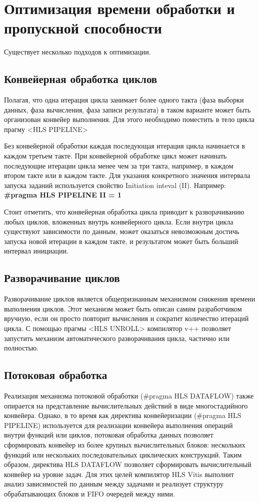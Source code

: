 \section{Оптимизация времени обработки и пропускной способности}

Существует несколько подходов к оптимизации.

\subsection{Конвейерная обработка циклов}

Полагая, что одна итерация цикла занимает более одного такта (фаза выборки данных, фаза вычисления, фаза записи результата) в таком варианте может быть организован конвейер выполнения. Для этого необходимо поместить в тело цикла прагму <HLS PIPELINE>

Без конвейерной обработки каждая последующая итерация цикла начинается в каждом третьем такте. При конвейерной обработке цикл может начинать последующие итерации цикла менее чем за три такта, например, в каждом втором такте или в каждом такте. Для указания конкретного значения интервала запуска заданий используется свойство Initiation inteval (II). Например: \textbf{\#pragma HLS PIPELINE II = 1}

Стоит отметить, что конвейерная обработка цикла приводит к разворачиванию любых циклов, вложенных внутрь конвейерного цикла. Если внутри цикла существуют зависимости по данным, может оказаться невозможным достичь запуска новой итерации в каждом такте, и результатом может быть больший интервал инициации.


\subsection{Разворачивание циклов}

Разворачивание циклов является общепризнанным механизмом снижения времени выполнения циклов. Этот механизм может быть описан самим разработчиком вручную, если он просто повторит вычисления и сократит количество итераций цикла. С помощью прагмы <HLS UNROLL> компилятор v++ позволяет запустить механизм автоматического разворачивания цикла, частично или полностью.


\subsection{Потоковая обработка}

Реализация механизма потоковой обработки (\#pragma HLS DATAFLOW) также опирается на представление вычислительных действий в виде многостадийного конвейера. Однако, в то время как директива конвейеризации (\#pragma HLS PIPELINE) используется для реализации конвейера выполнения операций внутри функций или циклов, потоковая обработка данных позволяет сформировать конвейер из более крупных вычислительных блоков: нескольких функций или нескольких последовательных циклических конструкций. Таким образом, директива HLS DATAFLOW позволяет сформировать вычислительный конвейер на уровне задач. Для этих целей компилятор HLS Vitis выполнит анализ зависимостей по данным между задачами и реализует структуру обрабатывающих блоков и FIFO очередей между ними.



